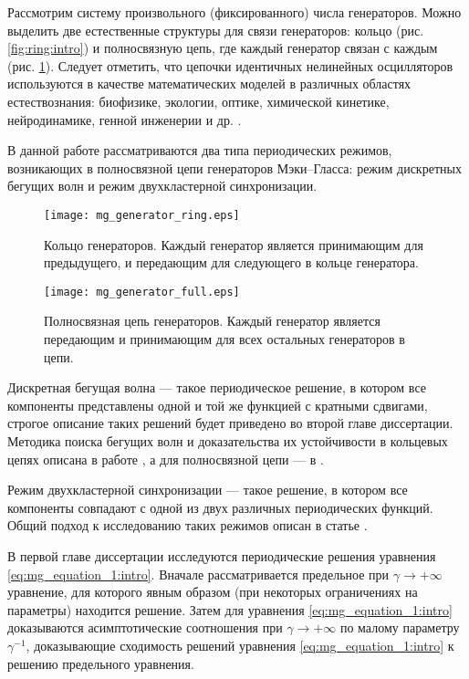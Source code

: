 Рассмотрим систему произвольного (фиксированного) числа генераторов. Можно выделить две естественные структуры для связи генераторов: кольцо (рис. \ref{fig:ring:intro}) и полносвязную цепь, где каждый генератор связан с каждым (рис. \ref{fig:full_mesh:intro}). Следует отметить, что цепочки идентичных нелинейных осцилляторов используются в качестве математических моделей в различных областях естествознания: биофизике, экологии, оптике, химической кинетике, нейродинамике, генной инженерии и др. \cite{Goodwin1963}.

В данной работе рассматриваются два типа периодических режимов, возникающих в полносвязной цепи генераторов Мэки--Гласса: режим дискретных бегущих волн и режим двухкластерной синхронизации.

\begin{figure}[ht]
	\begin{minipage}[b]{0.45\linewidth}
		\centering
		\texttt{[image: mg\_generator\_ring.eps]}
		\caption{Кольцо генераторов. Каждый генератор является принимающим для предыдущего, и передающим для следующего в кольце генератора.}
		\label{fig:ring:intro}
	\end{minipage}
	\hspace{0.5cm}
	\begin{minipage}[b]{0.45\linewidth}
		\centering
		\texttt{[image: mg\_generator\_full.eps]}
		\caption{Полносвязная цепь генераторов. Каждый генератор является передающим и принимающим для всех остальных генераторов в цепи.}
		\label{fig:full_mesh:intro}
	\end{minipage}
\end{figure}

Дискретная бегущая волна --- такое периодическое решение, в котором все компоненты представлены одной и той же функцией с кратными сдвигами, строгое описание таких решений будет приведено во второй главе диссертации. Методика поиска бегущих волн и доказательства их устойчивости в кольцевых цепях описана в работе \cite{Glyzin2012}, а для полносвязной цепи --- в \cite{Glyzin2022a}.

Режим двухкластерной синхронизации --- такое решение, в котором все компоненты совпадают с одной из двух различных периодических функций. Общий подход к исследованию таких режимов описан в статье \cite{Glyzin2022}.

В первой главе диссертации исследуются периодические решения уравнения \eqref{eq:mg_equation_1:intro}. Вначале рассматривается предельное при $\gamma \to +\infty$ уравнение, для которого явным образом (при некоторых ограничениях на параметры) находится решение. Затем для уравнения \eqref{eq:mg_equation_1:intro} доказываются асимптотические соотношения при $\gamma \to +\infty$ по малому параметру $\gamma^{-1}$, доказывающие сходимость решений уравнения \eqref{eq:mg_equation_1:intro} к решению предельного уравнения.

